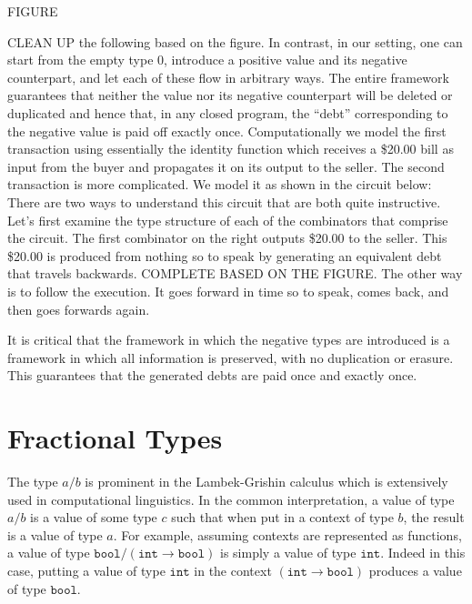 \documentclass[preprint]{sigplanconf}
\begin{document}
FIGURE

CLEAN UP the following based on the figure. In contrast, in our setting, one
can start from the empty type $0$, introduce a positive value and its
negative counterpart, and let each of these flow in arbitrary ways. The
entire framework guarantees that neither the value nor its negative
counterpart will be deleted or duplicated and hence that, in any closed
program, the ``debt'' corresponding to the negative value is paid off exactly
once. Computationally we model the first transaction using essentially the
identity function which receives a \$20.00 bill as input from the buyer and
propagates it on its output to the seller. The second transaction is more
complicated. We model it as shown in the circuit below: There are two ways to
understand this circuit that are both quite instructive. Let's first examine
the type structure of each of the combinators that comprise the circuit. The
first combinator on the right outputs \$20.00 to the seller. This \$20.00 is
produced from nothing so to speak by generating an equivalent debt that
travels backwards. COMPLETE BASED ON THE FIGURE. The other way is to follow
the execution. It goes forward in time so to speak, comes back, and then goes
forwards again.

It is critical that the framework in which the negative types are introduced
is a framework in which all information is preserved, with no duplication or
erasure. This guarantees that the generated debts are paid once and exactly
once.

\section{Fractional Types}

The type $a/b$ is prominent in the Lambek-Grishin calculus which is
extensively used in computational linguistics. In the common interpretation,
a value of type $a/b$ is a value of some type $c$ such that when put in a
context of type $b$, the result is a value of type $a$. For example, assuming
contexts are represented as functions, a value of type $\texttt{bool} /
(\texttt{int} \rightarrow \texttt{bool})$ is simply a value of type
$\texttt{int}$. Indeed in this case, putting a value of type $\texttt{int}$
in the context $(\texttt{int} \rightarrow \texttt{bool})$ produces a value of
type $\texttt{bool}$. 
\end{document}
